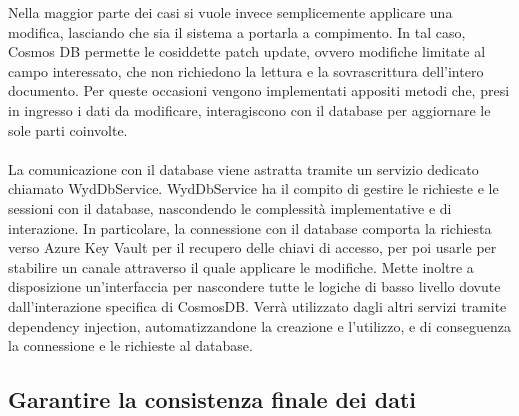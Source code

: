 Nella maggior parte dei casi si vuole invece semplicemente applicare una modifica,
lasciando che sia il sistema a portarla a compimento.
In tal caso, Cosmos DB permette le cosiddette patch update,
ovvero modifiche limitate al campo interessato,
che non richiedono la lettura e la sovrascrittura dell'intero documento.
Per queste occasioni vengono implementati appositi metodi che,
presi in ingresso i dati da modificare,
interagiscono con il database per aggiornare le sole parti coinvolte.\\
\\
La comunicazione con il database viene astratta tramite un servizio dedicato chiamato WydDbService.
WydDbService ha il compito di gestire le richieste e le sessioni con il database,
nascondendo le complessità implementative e di interazione.
In particolare, la connessione con il database comporta
la richiesta verso Azure Key Vault per il recupero delle chiavi di accesso,
per poi usarle per stabilire un canale attraverso il quale applicare le modifiche.
Mette inoltre a disposizione un'interfaccia per nascondere
tutte le logiche di basso livello dovute dall'interazione specifica di CosmosDB.
Verrà utilizzato dagli altri servizi tramite dependency injection,
automatizzandone la creazione e l'utilizzo,
e di conseguenza la connessione e le richieste al database.

\subsection{Garantire la consistenza finale dei dati}

